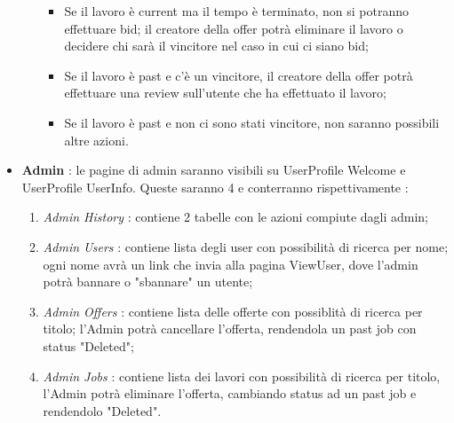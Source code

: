 \begin{itemize}
\begin{itemize}
\begin{itemize}
        \item Se il lavoro è current ma il tempo è terminato, non si potranno effettuare bid; il creatore della offer potrà eliminare il lavoro o decidere chi sarà il vincitore nel caso in cui ci siano bid;
        \item Se il lavoro è past e c'è un vincitore, il creatore della offer potrà effettuare una review sull'utente che ha effettuato il lavoro;
        \item Se il lavoro è past e non ci sono stati vincitore, non saranno possibili altre azioni.
      \end{itemize}
    \end{itemize}
    \item \textbf{Admin} : le pagine di admin saranno visibili su UserProfile \/ Welcome e UserProfile \/ UserInfo. Queste saranno 4 e conterranno rispettivamente :
    \begin{enumerate}
      \item \textit{Admin History} : contiene 2 tabelle con le azioni compiute dagli admin;
      \item \textit{Admin Users} : contiene lista degli user con possibilità di ricerca per nome; ogni nome avrà un link che invia alla pagina ViewUser, dove l'admin potrà bannare o "sbannare" un utente;
      \item \textit{Admin Offers} : contiene lista delle offerte con possiblità di ricerca per titolo; l'Admin potrà cancellare l'offerta, rendendola un past job con status "Deleted";
      \item \textit{Admin Jobs} : contiene lista dei lavori con possibilità di ricerca per titolo, l'Admin potrà eliminare l'offerta, cambiando status ad un past job e rendendolo "Deleted".
    \end{enumerate}
  \end{itemize}